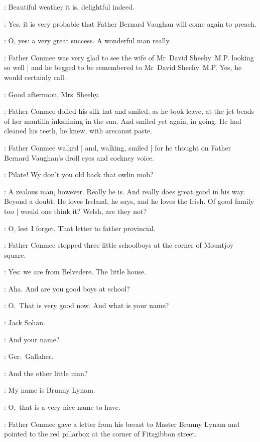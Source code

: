 \mrssheehy:
Beautiful weather it is, delightful indeed.

\conmee:
Yes, it is very probable that Father Bernard Vaughan will come again to preach.

\conmee:
O, yes: a very great success.
A wonderful man really.

:
Father Conmee was very glad 
to see the wife of Mr~David Sheehy~M.P. looking so well |
and he begged to be remembered to Mr~David Sheehy~M.P.
Yes, he would certainly call.

\conmee:
Good afternoon, Mrs~Sheehy.


:
Father Conmee doffed his silk hat and smiled,%
as he took leave,
at the jet beads of her mantilla inkshining in the sun.
And smiled yet again, in going.
He had cleaned his teeth, he knew, with arecanut paste.

:
Father Conmee walked |
and, walking, smiled |
for he thought on
Father Bernard Vaughan's droll eyes and cockney voice.

\conmeeint: 
Pilate!
Wy don't you old back that owlin mob?

\conmeeint:
A zealous man, however.
Really he is.
And really does great good in his way.
Beyond a doubt.
He loves Ireland, he says, and he loves the Irish.
Of good family too |
would one think it?
Welsh, are they not?

\conmeeint:
O, lest I forget.
That letter to father provincial.

:
Father Conmee stopped three little schoolboys%
at the corner of Mountjoy square.

\Boys:
Yes: we are from Belvedere.
The little house.

\conmee:
Aha.
And are you good boys at school?

\conmee:
O.~That is very good now.
And what is your name?

:
Jack Sohan.

\conmee:
And your name?

:
Ger.~Gallaher.

\conmee:
And the other little man?

:
My name is Brunny Lynam.

\conmee:
O,~that is a very nice name to have.

:
Father Conmee gave a letter from his breast to Master Brunny Lynam
and pointed to the red pillarbox at the corner of Fitzgibbon street.

